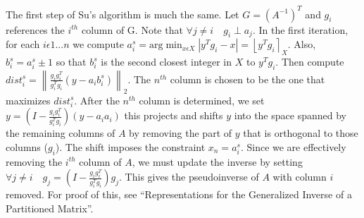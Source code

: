 \documentclass[11pt]{article}	%
\numberwithin{algorithm}{section}
\begin{document}
The first step of Su's algorithm is much the same. Let $G=(A^{-1})^T$ and $g_i$
references the $i^{th}$ column of G. Note that $\forall{j\neq i}\quad g_i \perp
a_j$. In the first iteration, for each $i\epsilon 1...n$ we compute $a_i^s =
\textrm{arg}\min_{x\epsilon X}\left | y^Tg_i - x \right | = \left \lfloor 
y^Tg_i \right \rceil_X$. Also, $b_i^s = a_i^s \pm 1$ so that $b_i^s$ is the
second closest integer in $X$ to $y^Tg_i$. Then compute $dist_i^s = \left \|
\frac{g_ig_i^T}{g_i^Tg_i}(y-a_ib_i^s) \right \|_2$.
The $n^{th}$ column is chosen to be the one that maximizes $dist_i^s$. After the
$n^{th}$ column is determined, we set
$y=(I-\frac{g_ig_i^T}{g_i^Tg_i})(y-a_ia_i)$ this projects and shifts $y$ into
the space spanned by the remaining columns of $A$ by removing the part of $y$
that is orthogonal to those columns ($g_i$). The shift imposes the constraint
$x_n = a_i^s$. Since we are effectively removing the $i^{th}$ column of $A$, we
must update the inverse by setting $\forall{j\neq i}\quad g_j = (I -
\frac{g_ig_i^T}{g_i^Tg_i})g_j$. This gives the pseudoinverse of $A$ with column
$i$ removed. For proof of this, see ``Representations for the Generalized
Inverse of a Partitioned Matrix''.\\\\
\end{document}
